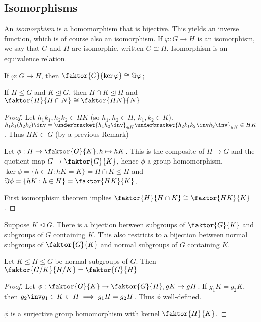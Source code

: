 \subsection{Isomorphisms}
An \textit{isomorphism} is a homomorphism that is bijective.
This yields an inverse function, which is of course also an isomorphism.
If $\varphi : G \to H$ is an isomorphism, we say that $G$ and $H$ are isomorphic, written $G \cong H$.
Isomorphism is an equivalence relation.

\begin{theorem}
	If $\varphi : G \to H$, then $\faktor{G}{\ker \varphi} \cong \Im \varphi$;
\end{theorem}

\begin{theorem}
	If $H \leq G$ and $K \trianglelefteq G$, then $H \cap K \trianglelefteq H$ and $\faktor{H}{H \cap N} \cong \faktor{HN}{N}$
\end{theorem}

\begin{proof}
	Let $h_1 k_1, h_2 k_2 \in HK$ (so $h_1, h_2 \in H$, $k_1, k_2 \in K$).
	$h_1 k_1 (h_2 k_2)\inv = \underbracket{h_1 h_2\inv}_{\in H} \underbracket{h_2 k_1 k_2\inv h_2\inv}_{\in K} \in HK$.
	Thus $HK \subset G$ (by a previous Remark)

	Let $\phi : H \to \faktor{G}{K}, h \mapsto hK$.
	This is the composite of $H \to G$ and the quotient map $G \to \faktor{G}{K}$, hence $\phi$ a group homomorphism.
	$\ker \phi = \{h \in H : hK = K\} = H \cap K \trianglelefteq H$ and $\Im \phi = \{hK : h \in H\} = \faktor{HK}{K}$.

	First isomorphism theorem implies $\faktor{H}{H \cap K} \cong \faktor{HK}{K}$.
\end{proof} 

\begin{remark} \label{rem:1.2}
	Suppose $K \trianglelefteq G$.
	There is a bijection between subgroups of $\faktor{G}{K}$ and subgroups of $G$ containing $K$.
	This also restricts to a bijection between normal subgroups of $\faktor{G}{K}$ and normal subgroups of $G$ containing $K$.
\end{remark} 

\begin{theorem}
	Let $K \leq H \leq G$ be normal subgroups of $G$.
	Then $\faktor{G/K}{H/K} = \faktor{G}{H}$
\end{theorem}

\begin{proof}
	Let $\phi : \faktor{G}{K} \to \faktor{G}{H}, gK \mapsto gH$.
	If $g_1 K = g_2 K$, then $g_2\inv g_1 \in K \subset H \implies g_1 H = g_2 H$.
	Thus $\phi$ well-defined.

	$\phi$ is a surjective group homomorphism with kernel $\faktor{H}{K}$.
\end{proof} 
